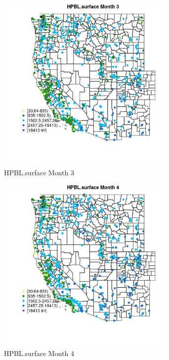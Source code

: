 \begin{figure} 
\centering  
\includegraphics[width=0.77\textwidth]{Code_Outputs/Report_ML_input_PM25_Step4_part_f_de_duplicated_aveswNAs_MapObsMo3HPBLsurface.jpg} 
\caption{\label{fig:Report_ML_input_PM25_Step4_part_f_de_duplicated_aveswNAsMapObsMo3HPBLsurface}HPBL.surface Month 3} 
\end{figure} 
 

\begin{figure} 
\centering  
\includegraphics[width=0.77\textwidth]{Code_Outputs/Report_ML_input_PM25_Step4_part_f_de_duplicated_aveswNAs_MapObsMo4HPBLsurface.jpg} 
\caption{\label{fig:Report_ML_input_PM25_Step4_part_f_de_duplicated_aveswNAsMapObsMo4HPBLsurface}HPBL.surface Month 4} 
\end{figure} 
 

